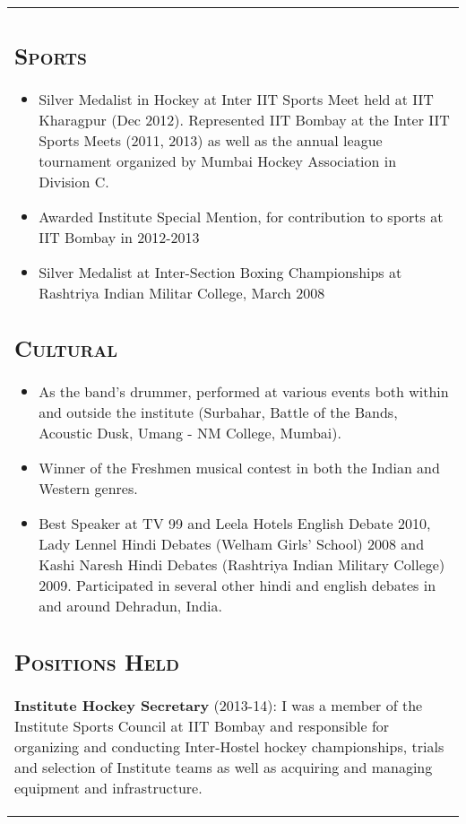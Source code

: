 \begin{tabular}{p{16cm}}
\vspace{-.4cm}
\subsection*{\textsc{Sports}}
	\begin{itemize}
		\item Silver Medalist in Hockey at Inter IIT Sports Meet held at IIT Kharagpur (Dec 2012). Represented IIT Bombay at the Inter IIT Sports Meets (2011, 2013) as well as the annual league tournament organized by Mumbai Hockey Association in Division C.
		\item Awarded Institute Special Mention, for contribution to sports at IIT Bombay in 2012-2013
		\item Silver Medalist at Inter-Section Boxing Championships at Rashtriya Indian Militar College, March 2008
	\end{itemize}

\subsection*{\textsc{Cultural}}
\begin{itemize}
	\item As the band's drummer, performed at various events both within and outside the institute (Surbahar, Battle of the Bands, Acoustic Dusk, Umang - NM College, Mumbai).
	\item Winner of the Freshmen musical contest in both the Indian and  Western genres. 
	\item Best Speaker at TV 99 and Leela Hotels English Debate 2010, Lady Lennel Hindi Debates (Welham Girls' School) 2008 and Kashi Naresh Hindi Debates (Rashtriya Indian Military College) 2009. Participated in several other hindi and english debates in and around Dehradun, India.  
\end{itemize}

\subsection*{\textsc{Positions Held}}
\textbf{Institute Hockey Secretary} (2013-14):
 I was a member of the Institute Sports Council at IIT Bombay and responsible for organizing and conducting Inter-Hostel hockey championships, trials and selection of Institute teams as well as acquiring and managing equipment and infrastructure.
\end{tabular}
